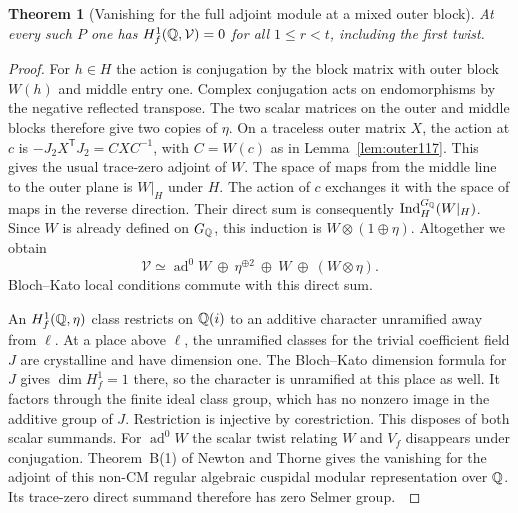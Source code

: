 \documentclass[a4paper,11pt]{article}
\newtheorem{theorem}[proposition]{Theorem}
\theoremstyle{definition}
\theoremstyle{remark}
\numberwithin{equation}{section}
\begin{document}
\begin{theorem}[Vanishing for the full adjoint module at a mixed outer block]
\label{thm:fullad120}
At every such \(P\) one has \(H^1_f(\mathbb Q,\mathcal V)=0\) for
all \(1\le r<t\), including the first twist.
\end{theorem}
\begin{proof}
For \(h\in H\) the action is conjugation by the block matrix
with outer block \(W(h)\) and middle entry one. Complex
conjugation acts on endomorphisms by the negative reflected
transpose. The two scalar matrices on the outer and middle
blocks therefore give two copies of \(\eta\). On a traceless
outer matrix \(X\), the action at \(c\) is
\(-J_2X^{\mathsf T}J_2=CXC^{-1}\), with \(C=W(c)\)
as in Lemma~\ref{lem:outer117}. This gives the usual
trace-zero adjoint of \(W\). The space of maps from the
middle line to the outer plane is \(W|_H\) under \(H\).
The action of \(c\) exchanges it with the space of maps in
the reverse direction. Their direct sum is consequently
\(\operatorname{Ind}_H^{G_\mathbb Q}(W|_H)\). Since \(W\) is already
defined on \(G_\mathbb Q\), this induction is
\(W\otimes(1\oplus\eta)\). Altogether we obtain
\begin{equation}
 \mathcal V\simeq\operatorname{ad}^0 W
       \ \oplus\ \eta^{\oplus2}\ \oplus\ W\ \oplus\ (W\otimes\eta).
 \label{eq:ad120}
\end{equation}
Bloch--Kato local conditions commute with this direct sum.

An \(H^1_f(\mathbb Q,\eta)\) class restricts on \(\mathbb Q(i)\) to an
additive character unramified away from \(\ell\). At a place
above \(\ell\), the unramified classes for the trivial
coefficient field \(J\) are crystalline and have dimension
one. The Bloch--Kato dimension formula for \(J\) gives
\(\dim H_f^1=1\) there, so the character is unramified at this
place as well. It factors through the finite ideal class group,
which has no nonzero image in the additive group of \(J\).
Restriction is injective by corestriction. This disposes of
both scalar summands. For \(\operatorname{ad}^0W\) the scalar
twist relating \(W\) and \(V_f\) disappears under conjugation.
Theorem~B(1) of Newton and Thorne gives the vanishing for the
adjoint of this non-CM regular algebraic cuspidal modular
representation over \(\mathbb Q\). Its trace-zero direct summand
therefore has zero Selmer group.~\cite{VI-IV-VI-nt119}


\end{proof}
\end{document}
